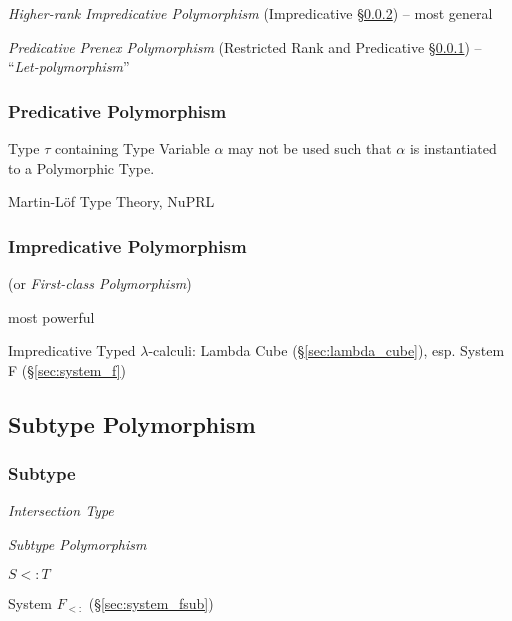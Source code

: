 \asterism


\emph{Higher-rank Impredicative Polymorphism} (Impredicative
\S\ref{sec:impredicative_polymorphism}) -- most general

\emph{Predicative Prenex Polymorphism} (Restricted Rank and
Predicative \S\ref{sec:predicative_polymorphism}) --
``\emph{Let-polymorphism}''



\subsubsection{Predicative Polymorphism}
\label{sec:predicative_polymorphism}

Type $\tau$ containing Type Variable $\alpha$ may not be used such
that $\alpha$ is instantiated to a Polymorphic Type.

Martin-L\"of Type Theory, NuPRL



\subsubsection{Impredicative Polymorphism}
\label{sec:impredicative_polymorphism}

(or \emph{First-class Polymorphism})

most powerful

Impredicative Typed $\lambda$-calculi: Lambda Cube
(\S\ref{sec:lambda_cube}), esp. System F (\S\ref{sec:system_f})



\subsection{Subtype Polymorphism}\label{sec:subtype_polymorphism}


\subsubsection{Subtype}\label{sec:subtype}

\emph{Intersection Type}

\emph{Subtype Polymorphism}

$S <: T$

System $F_{<:}$ (\S\ref{sec:system_fsub})

